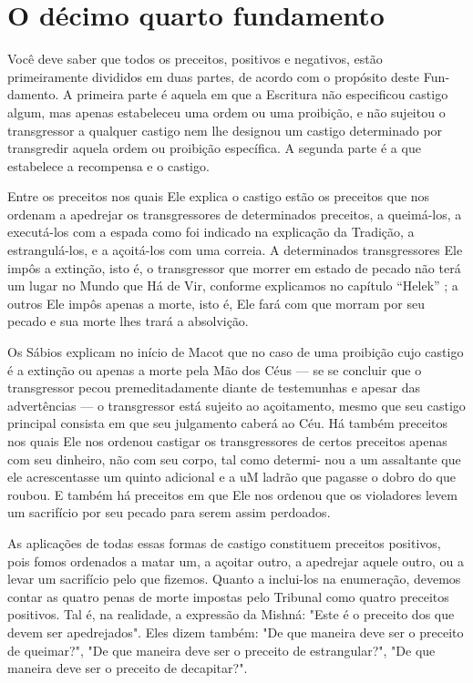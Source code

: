 \chapter*{O décimo quarto fundamento}

Você deve saber que todos os preceitos, positivos e negativos, estão
primeiramente divididos em duas partes, de acordo com o propósito deste
Fun­damento. A primeira parte é aquela em que a Escritura não
especificou castigo algum, mas apenas estabeleceu uma ordem ou uma
proibição, e não sujeitou o transgressor a qualquer castigo nem lhe
designou um castigo determinado por transgredir aquela ordem ou
proibição específica. A segunda parte é a que estabelece a recompensa e
o castigo.

Entre os preceitos nos quais Ele explica o castigo estão os preceitos
que nos ordenam a apedrejar os transgressores de determinados preceitos,
a queimá-los, a executá-los com a espada como foi indicado na explicação
da Tra­dição, a estrangulá-los, e a açoitá-los com uma correia. A
determinados trans­gressores Ele impôs a extinção, isto é, o
transgressor que morrer em estado de pecado não terá um lugar no Mundo
que Há de Vir, conforme explicamos no capítulo ``Helek'' ; a outros Ele
impôs apenas a morte, isto é, Ele fará com que morram por seu pecado e
sua morte lhes trará a absolvição.

Os Sábios explicam no início de Macot que no caso de uma proibi­ção cujo
castigo é a extinção ou apenas a morte pela Mão dos Céus --- se se
concluir que o transgressor pecou premeditadamente diante de testemunhas
e apesar das advertências --- o transgressor está sujeito ao
açoitamento, mesmo que seu castigo principal consista em que seu
julgamento caberá ao Céu. Há também preceitos nos quais Ele nos ordenou
castigar os transgressores de cer­tos preceitos apenas com seu dinheiro,
não com seu corpo, tal como determi-
nou a um assaltante que ele acrescentasse um quinto adicional e a uM
ladrão que pagasse o dobro do que roubou. E também há preceitos em que
Ele nos ordenou que os violadores levem um sacrifício por seu pecado
para serem as­sim perdoados.

As aplicações de todas essas formas de castigo constituem preceitos
positivos, pois fomos ordenados a matar um, a açoitar outro, a apedrejar
aque­le outro, ou a levar um sacrifício pelo que fizemos. Quanto a
inclui-los na enu­meração, devemos contar as quatro penas de morte
impostas pelo Tribunal co­mo quatro preceitos positivos. Tal é, na
realidade, a expressão da Mishná: "Es­te é o preceito dos que devem ser
apedrejados". Eles dizem também: "De que maneira deve ser o preceito de
queimar?", "De que maneira deve ser o precei­to de estrangular?", "De
que maneira deve ser o preceito de decapitar?".

